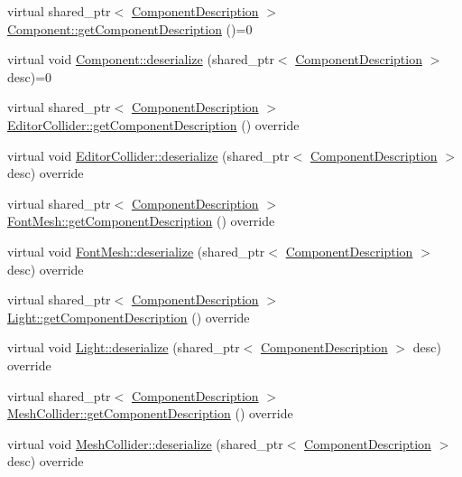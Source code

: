 \begin{DoxyCompactItemize}
\item 
virtual shared\+\_\+ptr$<$ \hyperlink{class_component_description}{Component\+Description} $>$ \hyperlink{group__serialization__functions_gad6dca56c78283c5a036496ce8d386523}{Component\+::get\+Component\+Description} ()=0
\item 
virtual void \hyperlink{group__serialization__functions_ga86158de289c38ea2b518043e1bb63f53}{Component\+::deserialize} (shared\+\_\+ptr$<$ \hyperlink{class_component_description}{Component\+Description} $>$ desc)=0
\item 
virtual shared\+\_\+ptr$<$ \hyperlink{class_component_description}{Component\+Description} $>$ \hyperlink{group__serialization__functions_gac3df1d451d142f9ec123c0439cd503eb}{Editor\+Collider\+::get\+Component\+Description} () override
\item 
virtual void \hyperlink{group__serialization__functions_ga9b02f2f116742850f196d8fc84e50af8}{Editor\+Collider\+::deserialize} (shared\+\_\+ptr$<$ \hyperlink{class_component_description}{Component\+Description} $>$ desc) override
\item 
virtual shared\+\_\+ptr$<$ \hyperlink{class_component_description}{Component\+Description} $>$ \hyperlink{group__serialization__functions_gab58270595083da13e7c384f00318291b}{Font\+Mesh\+::get\+Component\+Description} () override
\item 
virtual void \hyperlink{group__serialization__functions_ga76f4b78e5fd2adece4557f2a676f2c1b}{Font\+Mesh\+::deserialize} (shared\+\_\+ptr$<$ \hyperlink{class_component_description}{Component\+Description} $>$ desc) override
\item 
virtual shared\+\_\+ptr$<$ \hyperlink{class_component_description}{Component\+Description} $>$ \hyperlink{group__serialization__functions_gab8f75c87a12c9eed1fbb3534b516799c}{Light\+::get\+Component\+Description} () override
\item 
virtual void \hyperlink{group__serialization__functions_ga15349b8cfad97f209ae6ceb0d329bc34}{Light\+::deserialize} (shared\+\_\+ptr$<$ \hyperlink{class_component_description}{Component\+Description} $>$ desc) override
\item 
virtual shared\+\_\+ptr$<$ \hyperlink{class_component_description}{Component\+Description} $>$ \hyperlink{group__serialization__functions_ga92153fe80d9c2dcc91ce36050992f1d9}{Mesh\+Collider\+::get\+Component\+Description} () override
\item 
virtual void \hyperlink{group__serialization__functions_ga668f25c331d9519dfbd5f51a300cbb13}{Mesh\+Collider\+::deserialize} (shared\+\_\+ptr$<$ \hyperlink{class_component_description}{Component\+Description} $>$ desc) override

\end{DoxyCompactItemize}
